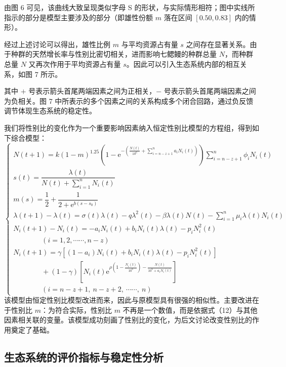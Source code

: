 \documentclass[11pt,a4paper]{ctexart}
\begin{document}
由图 6 可见，该曲线大致呈现类似字母 S 的形状，与实际情形相符；图中实线所指示的部分是模型主要涉及的部分（即雄性份额 $m$ 落在区间 $[0.50,0.83]$ 内的情形）。

经过上述讨论可以得出，雄性比例 $m$ 与平均资源占有量 $s$ 之间存在显著关系。由于种群的天然增长率与性别比密切相关，进而影响七鳃鳗的种群总量 $N$，而种群总量 $N$ 又再次作用于平均资源占有量 $s$。因此可以引入生态系统内部的相互关系，如图 7 所示。

其中 $+$ 号表示箭头首尾两端因素之间为正相关，$-$ 号表示箭头首尾两端因素之间为负相关。图 7 中所表示的多个因素之间的关系构成多个闭合回路，通过负反馈调节体现生态系统的稳定性。

我们将性别比的变化作为一个重要影响因素纳入恒定性别比模型的方程组，得到如下综合模型：
\begin{equation}
\begin{cases}
N(t+1)=k(1-m)^{1.25}\left(1-\mathrm{e}^{-\left(\frac{N(t)}{10^{6}}+\sum\limits_{i=n-z+1}^{n}a_{i}N_{i}(t)\right)}\right)\sum\limits_{i=n-z+1}^{n}\phi_{i}N_{i}(t)\\[6pt]
s(t)=\dfrac{\lambda(t)}{N(t)+\sum\limits_{i=1}^{n}N_{i}(t)}\\[6pt]
m(s)=\dfrac{1}{2}+\dfrac{1}{2+\mathrm{e}^{b(s-s_{0})}}\\[6pt]
\lambda(t+1)-\lambda(t)=\sigma(t)\lambda(t)-q\lambda^{2}(t)-\beta\lambda(t)N(t)-\sum\limits_{i=1}^{n}\mu_{i}\lambda(t)N_{i}(t)\\[6pt]
N_{i}(t+1)-N_{i}(t)=-a_{i}N_{i}(t)+b_{i}N_{i}(t)\lambda(t)-p_{i}N_{i}^{2}(t)\\
\qquad\qquad (i=1,2,\cdots\cdots,n-z)\\[6pt]
N_{i}(t+1)=\gamma\left[(1-a_{i})N_{i}(t)+b_{i}N_{i}(t)\lambda(t)-p_{i}N_{i}^{2}(t)\right]\\
\qquad\qquad +(1-\gamma)\left[N_{i}(t)\mathrm{e}^{\rho\left(1-\frac{N_{i}(t)}{10^{6}}\right)-\frac{N(t)}{10^{6}+a_{i}N_{i}(t)}}\right]\\
\qquad\qquad (i=n-z+1,\ n-z+2,\ \cdots\cdots,\ n)
\end{cases}
\end{equation}
该模型由恒定性别比模型改进而来，因此与原模型具有很强的相似性。主要改进在于性别比 $m$：为符合实际，性别比 $m$ 不再是一个数值，而是依据式（12）与其他因素相关联的变量。该模型成功刻画了性别比的变化，为后文讨论改变性别比的作用奠定了基础。

\subsection{生态系统的评价指标与稳定性分析}
\end{document}
